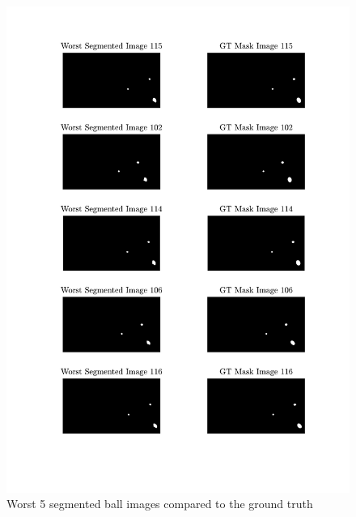 \documentclass[conference]{IEEEtran}
\begin{document}
\begin{figure}[htbp]
    \centering
    \includegraphics[width=\columnwidth]{figures/worst.pdf}
    \caption{Worst 5 segmented ball images compared to the ground truth\label{apx:worst}}
\end{figure}
\end{document}
